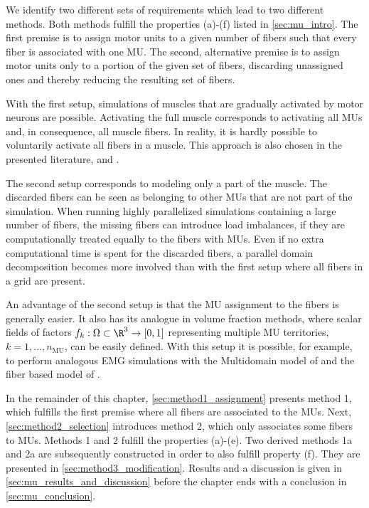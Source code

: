 We identify two different sets of requirements which lead to two different methods.
Both methods fulfill the properties (a)-(f) listed in \cref{sec:mu_intro}.
The first premise is to assign motor units to a given number of fibers such that every fiber is associated with one MU. The second, alternative premise is to assign motor units only to a portion of the given set of fibers, discarding unassigned ones and thereby reducing the resulting set of fibers.

With the first setup, simulations of muscles that are gradually activated by motor neurons are possible. Activating the full muscle corresponds to activating all MUs and, in consequence, all muscle fibers. In reality, it is hardly possible to voluntarily activate all fibers in a muscle. This approach is also chosen in the presented literature, \cite{Roehrle2012} and \cite{harry2018}.

The second setup corresponds to modeling only a part of the muscle. The discarded fibers can be seen as belonging to other MUs that are not part of the simulation. When running highly parallelized simulations containing a large number of fibers, the missing fibers can introduce load imbalances, if they are computationally treated equally to the fibers with MUs. Even if no extra computational time is spent for the discarded fibers, a parallel domain decomposition becomes more involved than with the first setup where all fibers in a grid are present.

An advantage of the second setup is that the MU assignment to the fibers is generally easier. It also has its analogue in volume fraction methods, where scalar fields of factors $f_k: \Omega \subset \R^3 \to [0,1]$ representing multiple MU territories, $k=1, \dots, n_\text{MU}$, can be easily defined. With this setup it is possible, for example, to perform analogous EMG simulations with the Multidomain model of \cite{Klotz2020} and the fiber based model of \cite{Mordhorst2015}.

In the remainder of this chapter, \cref{sec:method1_assignment} presents method 1, which fulfills the first premise where all fibers are associated to the MUs. Next, \cref{sec:method2_selection} introduces method 2, which only associates some fibers to MUs. Methods 1 and 2 fulfill the properties (a)-(e). Two derived methods 1a and 2a are subsequently constructed in order to also fulfill property (f). They are presented in \cref{sec:method3_modification}. Results and a discussion is given in \cref{sec:mu_results_and_discussion} before the chapter ends with a conclusion in \cref{sec:mu_conclusion}.

